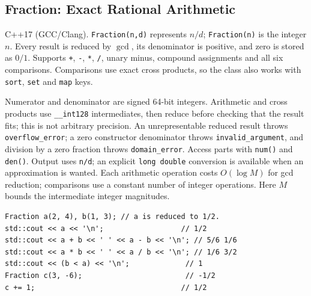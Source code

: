 \begingroup
\raggedright
\subsection{Fraction: Exact Rational Arithmetic}
C++17 (GCC/Clang). \texttt{Fraction(n,d)} represents $n/d$;
\texttt{Fraction(n)} is the integer $n$. Every result is reduced by
$\gcd$, its denominator is positive, and zero is stored as $0/1$.
Supports \texttt{+}, \texttt{-}, \texttt{*}, \texttt{/}, unary minus,
compound assignments and all six comparisons. Comparisons use exact
cross products, so the class also works with \texttt{sort},
\texttt{set} and \texttt{map} keys.

Numerator and denominator are signed 64-bit integers. Arithmetic
and cross products use \texttt{\_\_int128} intermediates, then reduce
before checking that the result fits; this is not arbitrary precision.
An unrepresentable reduced result throws \texttt{overflow\_error};
a zero constructor denominator throws \texttt{invalid\_argument},
and division by a zero fraction throws \texttt{domain\_error}.
Access parts with \texttt{num()} and \texttt{den()}.
Output uses \texttt{n/d}; an explicit \texttt{long double} conversion
is available when an approximation is wanted.
Each arithmetic operation costs $O(\log M)$ for gcd reduction;
comparisons use a constant number of integer operations.
Here $M$ bounds the intermediate integer magnitudes.

\begin{minipage}{\linewidth}
\begin{lstlisting}[style=C++,showstringspaces=false]
Fraction a(2, 4), b(1, 3); // a is reduced to 1/2.
std::cout << a << '\n';                  // 1/2
std::cout << a + b << ' ' << a - b << '\n'; // 5/6 1/6
std::cout << a * b << ' ' << a / b << '\n'; // 1/6 3/2
std::cout << (b < a) << '\n';             // 1
Fraction c(3, -6);                        // -1/2
c += 1;                                  // 1/2
\end{lstlisting}
\end{minipage}
\par
\endgroup
